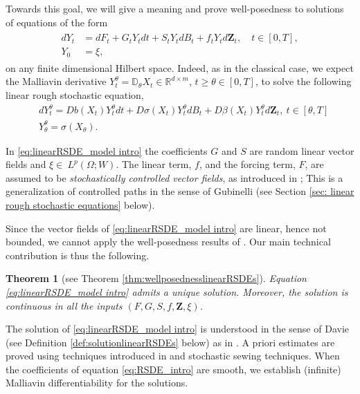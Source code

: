 \documentclass[11pt,a4paper]{article}
\newcommand{\R}{\mathbb{R}}
\theoremstyle{plain}
\newtheorem*{thm*}{Theorem}
\begin{document}
Towards this goal, we will give a meaning and prove well-posedness to solutions of equations of the form
\begin{align} \begin{aligned}
     dY_t &= dF_t +  G_tY_tdt + S_tY_tdB_t + f_t Y_td\mathbf{Z}_t, \quad t \in [0,T] ,\\
     Y_0&=\xi,
\end{aligned} \label{eq:linearRSDE_model intro}
\end{align}
on any finite dimensional Hilbert space.
Indeed, as in the classical case, we expect the Malliavin derivative $Y^{\theta}_t = \mathbb{D}_{\theta}X_t \in \R^{d \times m}$, $t\ge \theta \in [0,T]$, to solve the following linear rough stochastic equation,
\begin{equation} \label{eq:linearRSDEforthemalliavinderivative intro}
\begin{aligned} &dY^\theta_t=Db(X_t)Y^\theta_t dt+D\sigma(X_t)Y^\theta_t dB_t+D\beta(X_t) Y^\theta_t d\mathbf{Z}_t, \ t \in [\theta,T] \\ &Y^\theta_\theta=\sigma(X_\theta).
\end{aligned}
\end{equation}

In \eqref{eq:linearRSDE_model intro} the coefficients $G$ and $S$ are random linear vector fields and $\xi \in~L^p(\Omega;W).$ The linear term, $f$, and the forcing term, $F$, are assumed to be \emph{stochastically controlled vector fields}, as introduced in \cite{friz2020existence}; This is a generalization of controlled paths in the sense of Gubinelli \cite{gubinelli2004controlling} (see Section \ref{sec: linear rough stochastic equations} below). 


Since the vector fields of \eqref{eq:linearRSDE_model intro} are linear, hence not bounded, we cannot apply the well-posedness results of \cite{FHL21}. Our main technical contribution is thus the following. 
\begin{thm*}[see Theorem \ref{thm:wellposednesslinearRSDEs}]
    Equation \eqref{eq:linearRSDE_model intro} admits a unique solution. Moreover, the solution is continuous in all the inputs $(F,G,S,f,\mathbf{Z},\xi)$.
\end{thm*}
The solution of \eqref{eq:linearRSDE_model intro} is understood in the sense of Davie \cite{davie2008differential} (see Definition \ref{def:solutionlinearRSDEs} below) as in \cite{FHL21}. A priori estimates are proved using techniques introduced in \cite{bailleul2017unbounded} and stochastic sewing techniques.
When the coefficients of equation \eqref{eq:RSDE_intro} are smooth, we establish (infinite) Malliavin differentiability for the solutions.
\end{document}
